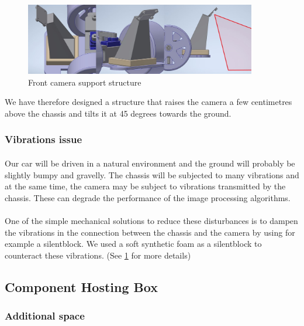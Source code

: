 \begin{figure}[!ht]
    \begin{center}
        \includegraphics[width=0.9\textwidth]{Images/camera_support.jpg}
    \end{center}
    \caption{Front camera support structure}
    \label{fig:camera_support}
\end{figure}

We have therefore designed a structure that raises the camera a few centimetres
above the chassis and tilts it at 45 degrees towards the ground. 

\subsubsection{Vibrations issue}
\paragraph{}
Our car will be driven in a natural environment and the ground will probably
be slightly bumpy and gravelly. The chassis will be
subjected to many vibrations and at the same time, the camera may be subject to
vibrations transmitted by the chassis. These can degrade the performance of the
image processing algorithms.

\paragraph{}
One of the simple mechanical solutions to reduce these disturbances is to dampen
the vibrations in the connection between the chassis and the camera by using for
example a silentblock.
We used a soft synthetic foam as a silentblock to counteract these vibrations.
(See \ref{fig:camera_support} for more details)

\subsection{Component Hosting Box}

\subsubsection{Additional space}
